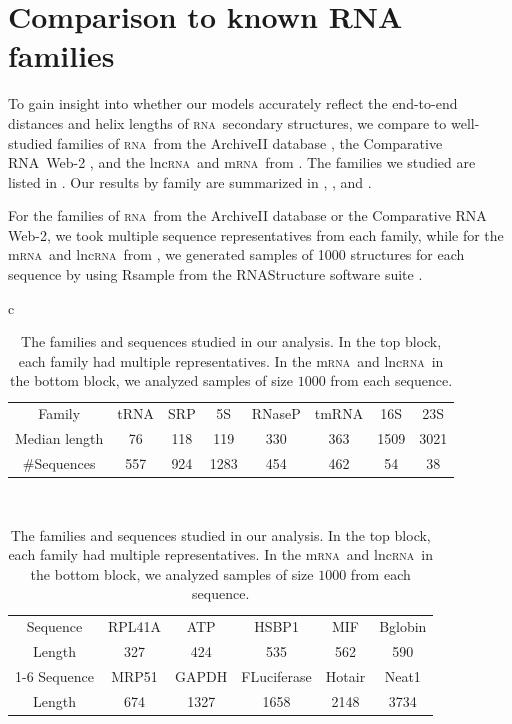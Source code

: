 \documentclass{article}
\newcommand{\RNA}{\textsc{rna}}
\newcommand{\rna}{\textsc{rna}}
\begin{document}
\section{Comparison to known RNA families} \label{sec:Data}

To gain insight into whether our models accurately reflect the end-to-end distances and helix lengths of \rna\ secondary structures, we compare to well-studied families of \rna\ from the ArchiveII database \cite{Sloma:2016}, the Comparative RNA\ Web-2 \cite{Cannone:2002, Chan:2023}, and the lnc\RNA\ and m\RNA\ from \cite{Lai:2018}.  The families we studied are listed in .  Our results by family are summarized in , , and .

For the families of \RNA\ from the ArchiveII database or the Comparative RNA Web-2, we took multiple sequence representatives from each family, while for the m\RNA\ and lnc\RNA\ from \cite{Lai:2018}, we generated samples of 1000 structures for each sequence by using Rsample from the RNAStructure software suite \cite{Reuter:2010}.  

\begin{table}[t]
\centering
\begin{tabular}{c}
  \begin{tabular}{c|ccccccc}
  \toprule
  Family & tRNA & SRP & 5S & RNaseP & tmRNA & 16S & 23S\\
  Median length & 76 & 118 & 119 & 330 & 363 & 1509 & 3021\\
  \#Sequences & 557 & 924 & 1283 & 454 & 462 & 54 & 38\\
  \bottomrule
  \end{tabular}
  \\
  \addlinespace
  \begin{tabular}{c|ccccc}
  \toprule
  Sequence & RPL41A & ATP & HSBP1 & MIF & Bglobin\\
  Length   & 327    & 424 & 535   & 562 & 590\\
  \cmidrule(l){1-6}
  Sequence & MRP51 & GAPDH & FLuciferase & Hotair & Neat1\\
  Length   & 674   & 1327 & 1658        & 2148  & 3734\\
  \bottomrule
  \end{tabular}
\end{tabular}
\caption{The families and sequences studied in our analysis.  In the top block, each family had multiple representatives.  In the m\RNA\ and lnc\RNA\ in the bottom block, we analyzed samples of size $1000$ from each sequence.}
\label{table:FamilyInfo}
\end{table}
\end{document}
